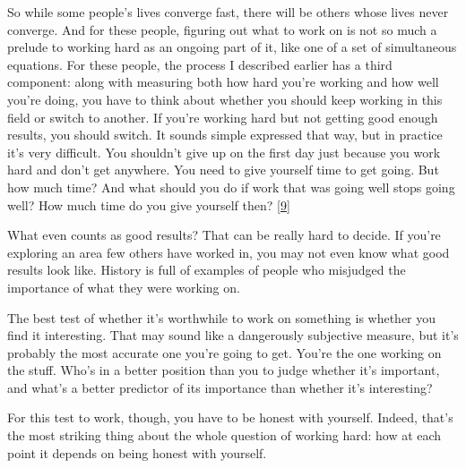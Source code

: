 So while some people's lives converge fast,
                  there will be others whose lives never converge. And for these
                  people, figuring out what to work on is not so much a prelude
                  to working hard as an ongoing part of it, like one of a set of
                  simultaneous equations. For these people, the process I
                  described earlier has a third component: along with measuring
                  both how hard you're working and how well you're doing, you
                  have to think about whether you should keep working in this
                  field or switch to another. If you're working hard but not
                  getting good enough results, you should switch. It sounds
                  simple expressed that way, but in practice it's very
                  difficult. You shouldn't give up on the first day just because
                  you work hard and don't get anywhere. You need to give
                  yourself time to get going. But how much time? And what should
                  you do if work that was going well stops going well? How much
                  time do you give yourself then?
                  [\href{\#f9n}{9}]

What even counts as good results? That can be
                  really hard to decide. If you're exploring an area few others
                  have worked in, you may not even know what good results look
                  like. History is full of examples of people who misjudged the
                  importance of what they were working on.

The best
                  test of whether it's worthwhile to work on something is
                  whether you find it interesting. That may sound like a
                  dangerously subjective measure, but it's probably the most
                  accurate one you're going to get. You're the one working on
                  the stuff. Who's in a better position than you to judge
                  whether it's important, and what's a better predictor of its
                  importance than whether it's interesting?

For this
                  test to work, though, you have to be honest with yourself.
                  Indeed, that's the most striking thing about the whole
                  question of working hard: how at each point it depends on
                  being honest with yourself.

